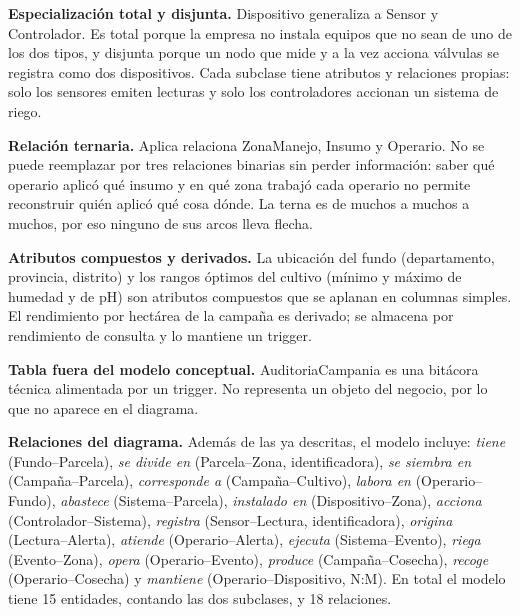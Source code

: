 \documentclass[11pt,letterpaper]{article}
\newcommand{\tbus}{\textunderscore\allowbreak}
\newcommand{\tb}[1]{{\ttfamily\let\_\tbus #1}}
\begin{document}
\textbf{Especialización total y disjunta.} \tb{Dispositivo} generaliza a \tb{Sensor} y \tb{Controlador}. Es total porque la empresa no instala equipos que no sean de uno de los dos tipos, y disjunta porque un nodo que mide y a la vez acciona válvulas se registra como dos dispositivos. Cada subclase tiene atributos y relaciones propias: solo los sensores emiten lecturas y solo los controladores accionan un sistema de riego.

\textbf{Relación ternaria.} \tb{Aplica} relaciona \tb{Zona\_Manejo}, \tb{Insumo} y \tb{Operario}. No se puede reemplazar por tres relaciones binarias sin perder información: saber qué operario aplicó qué insumo y en qué zona trabajó cada operario no permite reconstruir quién aplicó qué cosa dónde. La terna es de muchos a muchos a muchos, por eso ninguno de sus arcos lleva flecha.

\textbf{Atributos compuestos y derivados.} La ubicación del fundo (departamento, provincia, distrito) y los rangos óptimos del cultivo (mínimo y máximo de humedad y de pH) son atributos compuestos que se aplanan en columnas simples. El rendimiento por hectárea de la campaña es derivado; se almacena por rendimiento de consulta y lo mantiene un trigger.

\textbf{Tabla fuera del modelo conceptual.} \tb{Auditoria\_Campania} es una bitácora técnica alimentada por un trigger. No representa un objeto del negocio, por lo que no aparece en el diagrama.

\textbf{Relaciones del diagrama.} Además de las ya descritas, el modelo incluye: \emph{tiene} (Fundo--Parcela), \emph{se divide en} (Parcela--Zona, identificadora), \emph{se siembra en} (Campaña--Parcela), \emph{corresponde a} (Campaña--Cultivo), \emph{labora en} (Operario--Fundo), \emph{abastece} (Sistema--Parcela), \emph{instalado en} (Dispositivo--Zona), \emph{acciona} (Controlador--Sistema), \emph{registra} (Sensor--Lectura, identificadora), \emph{origina} (Lectura--Alerta), \emph{atiende} (Operario--Alerta), \emph{ejecuta} (Sistema--Evento), \emph{riega} (Evento--Zona), \emph{opera} (Operario--Evento), \emph{produce} (Campaña--Cosecha), \emph{recoge} (Operario--Cosecha) y \emph{mantiene} (Operario--Dispositivo, N:M). En total el modelo tiene 15 entidades, contando las dos subclases, y 18 relaciones.
\end{document}
